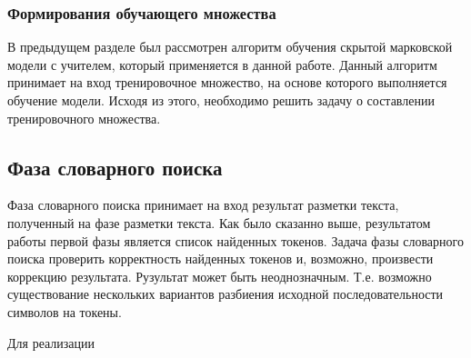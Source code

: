 \subsubsection{Формирования обучающего множества}
В предыдущем разделе был рассмотрен алгоритм обучения скрытой марковской модели с учителем, который применяется в данной работе. Данный алгоритм принимает на вход тренировочное множество, на основе которого выполняется обучение модели. Исходя из этого, необходимо решить задачу о составлении тренировочного множества.


\subsection{Фаза словарного поиска}
Фаза словарного поиска принимает на вход результат разметки текста, полученный на фазе разметки текста. Как было сказанно выше, результатом работы первой фазы является список найденных токенов. Задача фазы словарного поиска проверить корректность найденных токенов и, возможно, произвести коррекцию результата. Рузультат может быть неоднозначным. Т.е. возможно существование нескольких вариантов разбиения исходной последовательности символов на токены. 

Для реализации 

